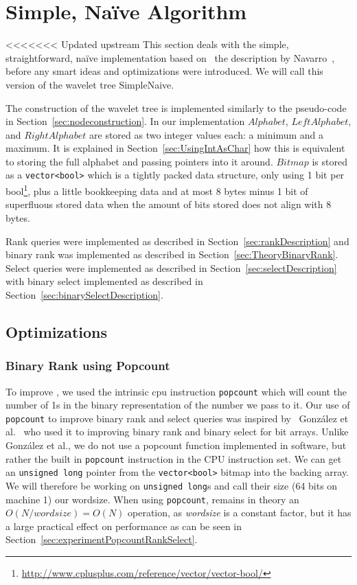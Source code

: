 \section{Simple, Naïve Algorithm}
<<<<<<< Updated upstream
This section deals with the simple, straightforward, naïve implementation based on ~the description by Navarro~, before any smart ideas and optimizations were introduced.
We will call this version of the wavelet tree SimpleNaive.

The construction of the wavelet tree is implemented similarly to the pseudo-code in Section~\ref{sec:nodeconstruction}.
In our implementation $Alphabet$, $LeftAlphabet$, and $RightAlphabet$ are stored as two integer values each: a minimum and a maximum.
It is explained in Section~\ref{sec:UsingIntAsChar} how this is equivalent to storing the full alphabet and passing pointers into it around.
$Bitmap$ is stored as a \texttt{vector<bool>} which is a tightly packed data structure, only using 1 bit per bool\footnote{\url{http://www.cplusplus.com/reference/vector/vector-bool/}}, plus a little bookkeeping data and at most 8 bytes minus 1 bit of superfluous stored data when the amount of bits stored does not align with 8 bytes.

Rank queries were implemented as described in Section~\ref{sec:rankDescription} and
binary rank was implemented as described in Section~\ref{sec:TheoryBinaryRank}.
Select queries were implemented as described in Section~\ref{sec:selectDescription} with binary select implemented as described in Section~\ref{sec:binarySelectDescription}.

\subsection{Optimizations}
\label{sec:simpleoptimizations}
\subsubsection{Binary Rank using Popcount}
\label{sec:popcountBinaryRank}
 
To improve , we used the intrinsic cpu instruction \texttt{popcount} which will count the number of 1s in the binary representation of the number we pass to it.
Our use of \texttt{popcount} to improve binary rank and select queries was inspired by~ González et al.~ who used it to improving binary rank and binary select for bit arrays.
Unlike González et al., we do not use a popcount function implemented in software, but rather the built in \texttt{popcount} instruction in the CPU instruction set.
We can get an \texttt{unsigned long} pointer from the \texttt{vector<bool>} bitmap into the backing array. We will therefore be working on \texttt{unsigned long}s and call their size (64 bits on machine 1) our wordsize.
When using \texttt{popcount},  remains in theory an $O(N/wordsize) = O(N)$ operation, as \textit{wordsize} is a constant factor, but it has a large practical effect on performance as can be seen in Section~\ref{sec:experimentPopcountRankSelect}.


